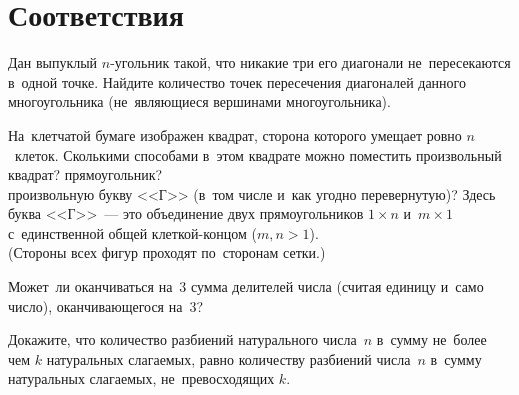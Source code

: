 

\section*{Соответствия}


\begin{problems}

\item
Дан выпуклый $n$-угольник такой, что никакие три его диагонали не~пересекаются
в~одной точке.
Найдите количество точек пересечения диагоналей данного многоугольника
(не~являющиеся вершинами многоугольника).


\item
На~клетчатой бумаге изображен квадрат, сторона которого умещает ровно
$n$~клеток.
Сколькими способами в~этом квадрате можно поместить произвольный
\\
\subproblem квадрат?
\qquad
\subproblem прямоугольник?
\\
\subproblem
произвольную букву <<Г>> (в~том числе и~как угодно перевернутую)?
Здесь буква <<Г>>~--- это объединение двух прямоугольников $1 \times n$
и~$m \times 1$ с~единственной общей клеткой-концом ($m, n > 1$).
\\
(Стороны всех фигур проходят по~сторонам сетки.)

\item
Может~ли оканчиваться на~$3$ сумма делителей числа (считая единицу и~само
число), оканчивающегося на~$3$?

\item
Докажите, что количество разбиений натурального числа~$n$ в~сумму не~более чем
$k$ натуральных слагаемых, равно количеству разбиений числа~$n$ в~сумму
натуральных слагаемых, не~превосходящих $k$.



\end{problems}
